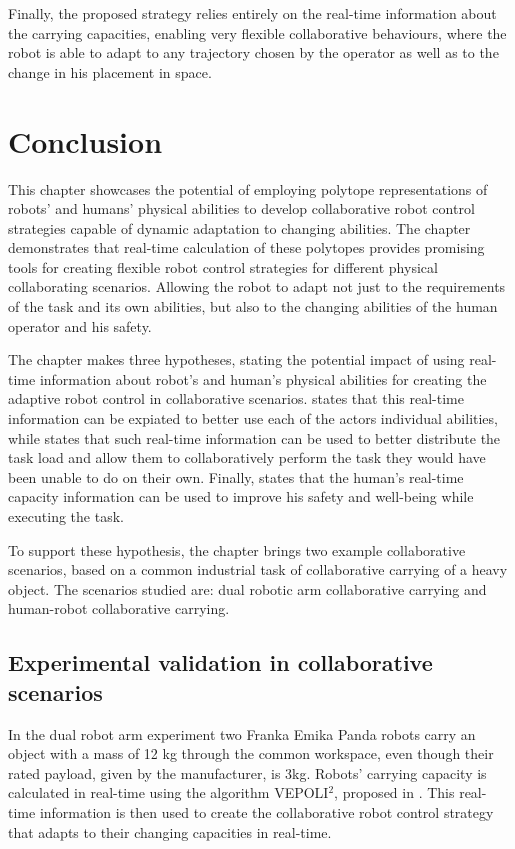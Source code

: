 Finally, the proposed strategy relies entirely on the real-time information about the carrying capacities, enabling very flexible collaborative behaviours, where the robot is able to adapt to any trajectory chosen by the operator as well as to the change in his placement in space. 

\section{Conclusion}

This chapter showcases the potential of employing polytope representations of robots' and humans' physical abilities to develop collaborative robot control strategies capable of dynamic adaptation to changing abilities. The chapter demonstrates that real-time calculation of these polytopes provides promising tools for creating flexible robot control strategies for different physical collaborating scenarios. Allowing the robot to adapt not just to the requirements of the task and its own abilities, but also to the changing abilities of the human operator and his safety.

The chapter makes three hypotheses, stating the potential impact of using real-time information about robot's and human's physical abilities for creating the adaptive robot control in collaborative scenarios.  states that this real-time information can be expiated to better use each of the actors individual abilities, while  states that such real-time information can be used to better distribute the task load and allow them to collaboratively perform the task they would have been unable to do on their own. Finally,  states that the human's real-time capacity information can be used to improve his safety and well-being while executing the task.

To support these hypothesis, the chapter brings two example collaborative scenarios, based on a common industrial task of collaborative carrying of a heavy object. The scenarios studied are: dual robotic arm collaborative carrying and human-robot collaborative carrying. 

\subsection{Experimental validation in collaborative scenarios}

In the dual robot arm experiment two Franka Emika Panda robots carry an object with a mass of 12 kg through the common workspace, even though their rated payload, given by the manufacturer, is 3kg. 
Robots' carrying capacity is calculated in real-time using the algorithm VEPOLI$^2$, proposed in . This real-time information is then used to create the collaborative robot control strategy that adapts to their changing capacities in real-time.

